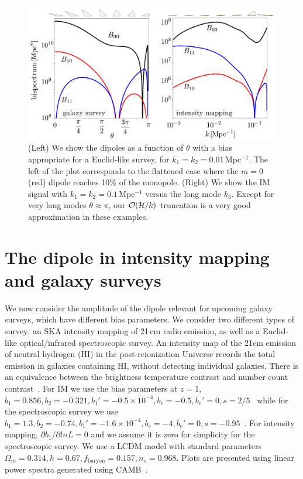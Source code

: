 \begin{figure}%
\begin{center}
\includegraphics[width=\columnwidth]{fig/figuresv2-01}
\caption{ (Left) We show the dipoles as a function of $\theta$ with a bias appropriate for a Euclid-like survey, for $k_1=k_2=0.01$\,Mpc$^{-1}$. The left of the plot corresponds to the flattened case where the $m=0$ (red) dipole reaches 10\% of the monopole.  (Right) We show the IM signal with $k_1=k_2=0.1$\,Mpc$^{-1}$ versus the long mode $k_3$. Except for very long modes $\theta\approx\pi$, our $\mathcal{O}(\mathcal{H}/k)$ truncation is a very good approximation in these examples. }
\label{sankcjnakjdcs}
\end{center}
\end{figure}
 


\section{The dipole in intensity mapping and galaxy surveys}

We now consider the amplitude of the dipole relevant for upcoming galaxy surveys, which have different bias parameters. We consider two different types of survey: an SKA intensity mapping of 21\,cm radio emission, as well as a Euclid-like optical/infrared spectroscopic survey.
An intensity map of the 21cm emission of neutral hydrogen (HI) in the post-reionization Universe records the total emission in galaxies containing HI, without detecting individual galaxies. There is an equivalence between the brightness temperature contrast and number count contrast~\citep{Umeh:2015gza}. For IM we use the bias parameters at $z=1$, 
$b_1 = 0.856, b_2 = -0.321, b_1' = -0.5\times10^{-4}, b_e = -0.5, b_e'=0, s = 2/5$~\citep{Fonseca:2018hsu,Umeh:2015gza}
while for the spectroscopic survey we use 
$ b_1 = 1.3,b_2 = -0.74, b_1' = -1.6\times10^{-4},  b_e = -4, b_e' = 0, s = -0.95$~\citep{Camera:2018jys,Yankelevich:2018uaz}.
For intensity mapping, $ \partial b_1/\partial ln L =0$ and we assume it is zero for simplicity for the spectroscopic survey. We use a LCDM model with standard parameters $\Omega_m=0.314, h=0.67, f_\text{baryon}=0.157, n_s=0.968$. Plots are presented using linear power spectra generated using CAMB~\citep{Lewis:1999bs}.

